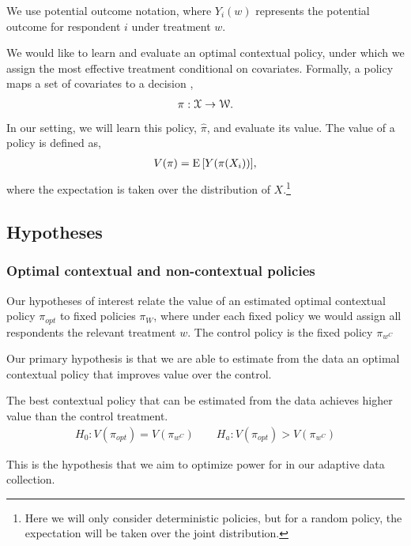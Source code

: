 \documentclass[letterpaper, 12pt, parskip=full,]{scrartcl}
\begin{document}
We use potential outcome notation, where $Y_i(w)$ represents the potential outcome for respondent $i$ under treatment $w$.%


We would like to learn and evaluate an optimal contextual policy, under which we assign the most effective treatment conditional on covariates. Formally, a policy maps a set of covariates to a decision \citep{athey2017efficient}, %
\begin{align}
  \pi: {\EuScript X} \rightarrow {\EuScript W}. 
  \label{eq:policy}
\end{align}
In our setting, we will learn this policy, $\hat \pi$, and evaluate its value. The value of a policy is defined as, 
\begin{align}
V(\pi) =  {\textrm E}\,[Y(\pi(X_{i}))],
  \label{eq:policy_value}
\end{align}
where the expectation is taken over the distribution of $X$.\footnote{Here we will only consider deterministic policies, but for a random policy, the expectation will be taken over the joint distribution. }

\subsection{Hypotheses}\label{hypotheses}

\subsubsection{Optimal contextual and non-contextual policies}\label{policiesbest}
Our hypotheses of interest relate the value of an estimated optimal contextual policy $\pi_{opt}$ to fixed policies $\pi_{W}$, where under each fixed policy we would assign all respondents the relevant treatment $w$. The control policy is the fixed policy $\pi_{w^{C}}$

Our primary hypothesis is that we are able to estimate from the data an optimal contextual policy that improves value over the control. 
  \begin{hypothesis}
  The best contextual policy that can be estimated from the data achieves higher value than the control treatment. \label{eq:optctr}
\begin{align}
  H_{0}: V(\pi_{opt}) = V(\pi_{w^{C}}) \qquad H_{a}:  V(\pi_{opt}) > V(\pi_{w^{C}})
\end{align}
\end{hypothesis}
This is the hypothesis that we aim to optimize power for in our adaptive data collection. 
\end{document}

